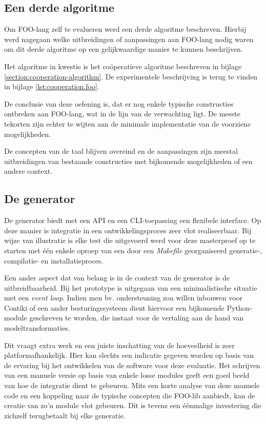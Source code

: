 \vspace{-3mm}

\subsection{Een derde algoritme}

Om FOO-lang zelf te evalueren werd een derde algoritme beschreven. Hierbij werd
nagegaan welke uitbreidingen of aanpassingen aan FOO-lang nodig waren om dit
derde algoritme op een gelijkwaardige manier te kunnen beschrijven.

Het algoritme in kwestie is het co\"operatieve algoritme beschreven in bijlage
\ref{section:cooperation-algorithm}. De experimentele beschrijving is terug te
vinden in bijlage \ref{lst:cooperation.foo}.

De conclusie van deze oefening is, dat er nog enkele typische constructies
ontbreken aan FOO-lang, wat in de lijn van de verwachting ligt. De meeste
tekorten zijn echter te wijten aan de minimale implementatie van de voorziene
mogelijkheden.

De concepten van de taal blijven overeind en de aanpassingen zijn meestal
uitbreidingen van bestaande constructies met bijkomende mogelijkheden of een
andere context.

\vspace{-3mm}

\subsection{De generator}

De generator biedt met een API en een CLI-toepassing een flexibele interface.
Op deze manier is integratie in een ontwikkelingsproces zeer vlot
realiseerbaar. Bij wijze van illustratie is elke test die uitgevoerd werd voor
deze masterproef op te starten met \'e\'en enkele oproep van een door een
\emph{Makefile} georganiseerd generatie-, compilatie- en installatieproces.

Een ander aspect dat van belang is in de context van de generator is de
uitbreidbaarheid. Bij het prototype is uitgegaan van een minimalistische
situatie met een \emph{event loop}. Indien men bv. ondersteuning zou willen
inbouwen voor Contiki of een ander besturingssysteem dient hiervoor een
bijkomende Python-module geschreven te worden, die instaat voor de vertaling
aan de hand van modeltransformaties.

Dit vraagt extra werk en een juiste inschatting van de hoeveelheid is zeer
platformafhankelijk. Hier kan slechts een indicatie gegeven worden op basis van
de ervaring bij het ontwikkelen van de software voor deze evaluatie. Het
schrijven van een manuele versie op basis van enkele losse modules geeft een
goed beeld van hoe de integratie dient te gebeuren. Mits een korte analyse van
deze manuele code en een koppeling naar de typische concepten die FOO-lib
aanbiedt, kan de creatie van zo'n module vlot gebeuren. Dit is tevens een
\'e\'enmalige investering die zichzelf terugbetaalt bij elke generatie.

